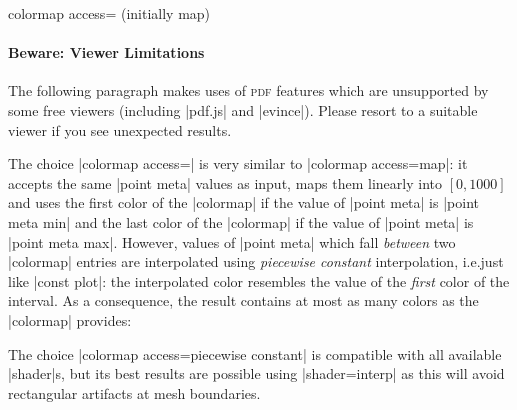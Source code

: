 \begin{pgfplotskey}{colormap access= (initially map)%
}
    \paragraph{Beware: Viewer Limitations}

    The following paragraph makes uses of \textsc{pdf} features which are
    unsupported by some free viewers (including |pdf.js| and |evince|). Please
    resort to a suitable viewer if you see unexpected results.

    The choice |colormap access=| is very
    similar to |colormap access=map|: it accepts the same |point meta| values
    as input, maps them linearly into $[0,1000]$ and uses the first color of
    the |colormap| if the value of |point meta| is |point meta min| and the
    last color of the |colormap| if the value of |point meta| is
    |point meta max|. However, values of |point meta| which fall \emph{between}
    two |colormap| entries are interpolated using \emph{piecewise constant}
    interpolation, i.e.\@ just like |const plot|: the interpolated color
    resembles the value of the \emph{first} color of the interval. As a
    consequence, the result contains at most  as many colors as the |colormap|
    provides:
\begin{codeexample}[]
\end{codeexample}
    The choice |colormap access=piecewise constant| is compatible with all
    available |shader|s, but its best results are possible using
    |shader=interp| as this will avoid rectangular artifacts at mesh
    boundaries.
\begin{codeexample}[]
\end{codeexample}


\end{pgfplotskey}
